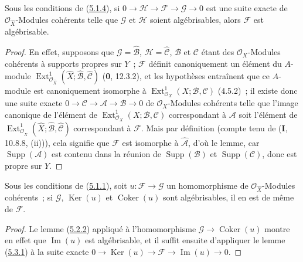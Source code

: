 \begin{lemma}[5.3.1]
\label{III.5.3.1-fr}
Sous les conditions de \textup{(\hyperref[III.5.1.4-fr]{5.1.4})}, si
$0\to\mathcal H\to\mathcal F\to\mathcal G\to0$
est une suite exacte de $\mathcal O_{\widehat X}$-Modules cohérents telle que
$\mathcal G$ et $\mathcal H$ soient algébrisables, alors $\mathcal F$ est
algébrisable.
\end{lemma}

\begin{proof}
En effet, supposons que $\mathcal G=\widehat{\mathcal B}$,
$\mathcal H=\widehat{\mathcal C}$, $\mathcal B$ et $\mathcal C$ étant des
$\mathcal O_X$-Modules cohérents à supports propres sur $Y$~; $\mathcal F$ définit
canoniquement un élément du $A$-module
$\operatorname{Ext}^1_{\mathcal O_{\widehat X}}
(\widehat X;\widehat{\mathcal B},\widehat{\mathcal C})$
(\textbf{0}, 12.3.2), et les hypothèses entraînent que ce $A$-module est canoniquement
isomorphe à
$\operatorname{Ext}^1_{\mathcal O_X}(X;\mathcal B,\mathcal C)$
(4.5.2)~; il existe donc une suite exacte
$0\to\mathcal C\to\mathcal A\to\mathcal B\to0$ de $\mathcal O_X$-Modules
cohérents telle que l'image canonique de l'élément de
$\operatorname{Ext}^1_{\mathcal O_X}(X;\mathcal B,\mathcal C)$ correspondant à
$\mathcal A$ soit l'élément de
$\operatorname{Ext}^1_{\mathcal O_{\widehat X}}
(\widehat X;\widehat{\mathcal B},\widehat{\mathcal C})$ correspondant à
$\mathcal F$. Mais par définition (compte tenu de (\textbf{I}, 10.8.8, (ii))), cela signifie
que $\mathcal F$ est isomorphe à $\widehat{\mathcal A}$, d'où le lemme, car
$\operatorname{Supp}(\mathcal A)$ est contenu dans la réunion de
$\operatorname{Supp}(\mathcal B)$ et $\operatorname{Supp}(\mathcal C)$, donc est
propre sur $Y$.
\end{proof}

\begin{corollary}[5.3.2]
\label{III.5.3.2-fr}
Sous les conditions de \textup{(\hyperref[III.5.1.1-fr]{5.1.1})}, soit
$u:\mathcal F\to\mathcal G$ un homomorphisme de
$\mathcal O_{\widehat X}$-Modules cohérents~; si $\mathcal G$,
$\operatorname{Ker}(u)$ et $\operatorname{Coker}(u)$ sont algébrisables, il en est
de même de $\mathcal F$.
\end{corollary}

\begin{proof}
Le lemme (\hyperref[III.5.2.2-fr]{5.2.2}) appliqué à l'homomorphisme
$\mathcal G\to\operatorname{Coker}(u)$ montre en effet que
$\operatorname{Im}(u)$ est algébrisable, et il suffit ensuite d'appliquer le lemme
(\hyperref[III.5.3.1-fr]{5.3.1}) à la suite exacte
$0\to\operatorname{Ker}(u)\to\mathcal F\to\operatorname{Im}(u)\to0$.
\end{proof}

